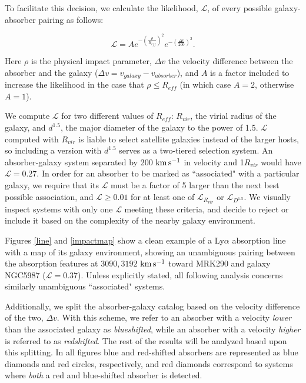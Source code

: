\documentclass[iop]{emulateapj-rtx4}
\begin{document}
To facilitate this decision, we calculate the likelihood, $\mathcal{L}$, of every possible galaxy-absorber pairing as follows:

\begin{equation}
	\mathcal{L} = A e^{-(\frac{\rho}{R_{eff}})^2} e^{-(\frac{\Delta v}{200})^2}.
\end{equation}

\noindent Here $\rho$ is the physical impact parameter, $\Delta v$ the velocity difference between the absorber and the galaxy ($\Delta v = v_{galaxy} - v_{absorber}$), and $A$ is a factor included to increase the likelihood in the case that $\rho \leq R_{eff}$ (in which case $A = 2$, otherwise $A = 1$). 

We compute $\mathcal{L}$ for two different values of $R_{eff}$: $R_{vir}$, the virial radius of the galaxy, and $d^{1.5}$, the major diameter of the galaxy to the power of 1.5. $\mathcal{L}$ computed with $R_{vir}$ is liable to select satellite galaxies instead of the larger hosts, so including a version with $d^{1.5}$ serves as a two-tiered selection system. An absorber-galaxy system separated by 200 $\rm km\, s^{-1}$ in velocity and 1$R_{vir}$ would have $\mathcal{L} = 0.27$. In order for an absorber to be marked as ``associated" with a particular galaxy, we require that its $\mathcal{L}$ must be a factor of 5 larger than the next best possible association, and $\mathcal{L} \ge 0.01$ for at least one of $\mathcal{L}_{R_{vir}}$ or $\mathcal{L}_{D^{1.5}}$. We visually inspect systems with only one $\mathcal{L}$ meeting these criteria, and decide to reject or include it based on the complexity of the nearby galaxy environment. 


Figures \ref{line} and \ref{impactmap} show a clean example of a Ly$\alpha$ absorption line with a map of its galaxy environment, showing an unambiguous pairing between the absorption features at $3090, 3192$ $\rm km\, s^{-1}$ toward MRK290 and galaxy NGC5987 ($\mathcal{L} = 0.37$). Unless explicitly stated, all following analysis concerns similarly unambiguous ``associated" systems. 

Additionally, we split the absorber-galaxy catalog based on the velocity difference of the two, $\Delta v$. With this scheme, we refer to an absorber with a velocity \textit{lower} than the associated galaxy as \textit{blueshifted}, while an absorber with a velocity \textit{higher} is referred to as \textit{redshifted}. The rest of the results will be analyzed based upon this splitting. In all figures blue and red-shifted absorbers are represented as blue diamonds and red circles, respectively, and red diamonds correspond to systems where \textit{both} a red and blue-shifted absorber is detected.
\end{document}
